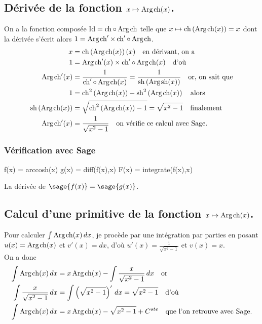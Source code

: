 \documentclass[a4paper,landscape,17pt]{extreport} %
\def\Id{\ensuremath{\mathrm{Id}}}
\renewcommand{\sinh}{\mathop{\mathrm{sh}}}
\renewcommand{\cosh}{\mathop{\mathrm{ch}}}
\renewcommand{\arg}{\mathop{\mathrm{Arg}}}
\begin{document}
\subsection{Dérivée de la fonction $x \mapsto \arg\mspace{-1mu}\cosh(x)$.\label{argcosh}}
On a la fonction composée $\Id = \cosh \circ \arg\mspace{-1mu}\cosh$ telle que $x\mapsto\cosh\left(\arg\mspace{-1mu}\cosh(x)\right)=x$ dont la dérivée s'écrit alors $1= \arg\mspace{-1mu}\cosh\nolimits' \times \cosh\nolimits'\circ\arg\mspace{-1mu}\cosh$.
\begin{align*}
x & =\cosh\left(\arg\mspace{-1mu}\cosh(x)\right)(x) \quad \textrm{en dérivant, on a}\\
1 & = \arg\mspace{-1mu}\cosh\nolimits'(x) \times \cosh\nolimits'\circ\arg\mspace{-1mu}\cosh(x) \quad \textrm{d'où}\\
\arg\mspace{-1mu}\cosh\nolimits'(x) & =\frac{1}{ \cosh\nolimits'\circ\arg\mspace{-1mu}\cosh(x)}=\frac{1}{ \sinh\left(\arg\mspace{-1mu}\sinh(x)\right)}\quad \textrm{or, on sait que}\\
1 & = \cosh\nolimits^2\left(\arg\mspace{-1mu}\cosh(x)\right) - \sinh\nolimits^2\left(\arg\mspace{-1mu}\cosh(x)\right) \quad \textrm{alors}\\
\sinh\left(\arg\mspace{-1mu}\cosh(x)\right) & = \sqrt{\cosh\nolimits^2\left(\arg\mspace{-1mu}\cosh(x)\right)-1}=\sqrt{x^2-1}\quad \textrm{finalement}\\
\arg\mspace{-1mu}\cosh\nolimits'(x) & = \frac{1}{ \sqrt{x^2-1}}\quad \textrm{on vérifie ce calcul avec Sage.}
\end{align*}


\subsubsection{Vérification avec Sage}


\begin{sageblock}
    f(x) = arccosh(x)
    g(x) = diff(f(x),x)
    F(x) = integrate(f(x),x)
\end{sageblock}

La dérivée de $\sage{f(x)} = \sage{g(x)} $.


\subsection{Calcul d'une primitive de la fonction  $x \mapsto \arg\mspace{-1mu}\cosh(x)$.}

Pour calculer $\int \arg\mspace{-1mu}\cosh(x) \, dx$, je procède par une intégration par parties en posant $u(x) = \arg\mspace{-1mu}\cosh(x)$ et $v'(x) = dx$, d'où $u'(x) = \frac{1}{ \sqrt{x^2-1}}$ et $ v(x) = x $. \\
On a donc
\begin{align*}
\int \arg\mspace{-1mu}\cosh(x) \, dx & = x \arg\mspace{-1mu}\cosh(x) - \int \frac{x}{ \sqrt{x^2-1}} \, dx \quad \textrm{or}\\
\int \frac{x}{ \sqrt{x^2-1}} \, dx & = \int \left(\sqrt{x^2-1}\right)' \, dx = \sqrt{x^2-1}  \quad \textrm{d'où}\\
\int \arg\mspace{-1mu}\cosh(x) \, dx & = x \arg\mspace{-1mu}\cosh(x) - \sqrt{x^2-1} + C^{ste} \quad \textrm{que l'on retrouve avec Sage.}
\end{align*}
\end{document}
